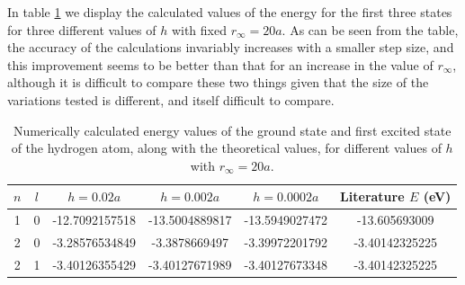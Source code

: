 \documentclass{article}
\begin{document}
In table \ref{tab:2b_iii} we display the calculated values of the energy for the first three states for three different values of $h$ with fixed $r_\infty=20a$. As can be seen from the table, the accuracy of the calculations invariably increases with a smaller step size, and this improvement seems to be better than that for an increase in the value of $r_\infty$, although it is difficult to compare these two things given that the size of the variations tested is different, and itself difficult to compare. 

\begin{table}[H]
	\centering
	\caption{Numerically calculated energy values of the ground state and first excited state of the hydrogen atom, along with the theoretical values, for different values of $h$ with $r_\infty=20a$.}
	\label{tab:2b_iii}
	\begin{tabular}{c|c|c|c|c|c}
		$n$ & $l$ & $h = 0.02a$ & $h = 0.002a$ & $h = 0.0002a$ & Literature $E$ (eV) \\
		\hline
		1 & 0 & -12.7092157518 & -13.5004889817 & -13.5949027472 & -13.605693009 \\
		2 & 0 & -3.28576534849 & -3.3878669497 & -3.39972201792 & -3.40142325225 \\
		2 & 1 & -3.40126355429 & -3.40127671989 & -3.40127673348 & -3.40142325225 \\
	\end{tabular}
\end{table}
\end{document}
